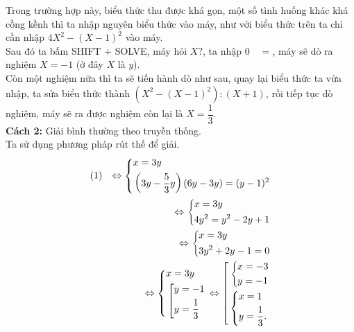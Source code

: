 \begin{vd}
{		Trong trường hợp này, biểu thức thu được khá gọn, một số tình huống khác khá cồng kềnh thì ta nhập nguyên biểu thức vào máy, như với biểu thức trên ta chỉ cần nhập $4X^2 -(X-1)^2$ vào máy.\\
		Sau đó ta bấm SHIFT + SOLVE, máy hỏi $X?$, ta nhập $ \boxed{0} \quad \boxed{=}$, máy sẽ dò ra nghiệm $X=-1$ (ở đây $X$ là $y$).\\
		Còn một nghiệm nữa thì ta sẽ tiến hành dò như sau, quay lại biểu thức ta vừa nhập, ta sửa biểu thức thành $\left( X^2 -(X-1)^2 \right) : (X+1)$, rồi tiếp tục dò nghiệm, máy sẽ ra được nghiệm còn lại là $X=\dfrac{1}{3}$.\\
		\textbf{Cách 2:} Giải bình thường theo truyền thống.\\
		Ta sử dụng phương pháp rút thế để giải.\\
		\begin{eqnarray*}
			& (1) & \Leftrightarrow \left\{\begin{aligned}&x=3y\\&\left(3y-\dfrac{5}{3}y\right)(6y-3y)=(y-1)^2\end{aligned}\right. \\
			& & \Leftrightarrow \left\{\begin{aligned}&x=3y\\&4y^2=y^2-2y+1\end{aligned}\right.\\
			& & \Leftrightarrow \left\{\begin{aligned}&x=3y\\&3y^2+2y-1=0\end{aligned}\right.\\
			& & \Leftrightarrow \left\{\begin{aligned}&x=3y\\&\left[\begin{aligned}&y=-1\\&y=\dfrac{1}{3}\end{aligned}\right.\end{aligned}\right. \Leftrightarrow \left[\begin{aligned}&\left\{\begin{aligned}&x=-3\\&y=-1\end{aligned}\right.\\& \left\{\begin{aligned}&x=1\\&y=\dfrac{1}{3}.\end{aligned}\right.\end{aligned}\right.
		\end{eqnarray*}
	}
\end{vd}
